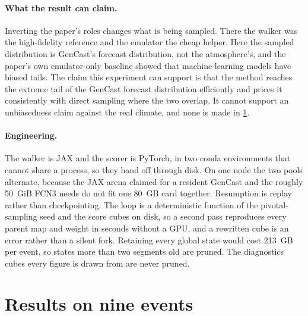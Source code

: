 \documentclass[10pt,twocolumn]{article}
\begin{document}
\paragraph{What the result can claim.}
Inverting the paper's roles changes what is being sampled. There the walker was the high-fidelity reference and the emulator the cheap helper. Here the sampled distribution is GenCast's forecast distribution, not the atmosphere's, and the paper's own emulator-only baseline showed that machine-learning models have biased tails. The claim this experiment can support is that the method reaches the extreme tail of the GenCast forecast distribution efficiently and prices it consistently with direct sampling where the two overlap. It cannot support an unbiasedness claim against the real climate, and none is made in \cref{sec:results}.

\paragraph{Engineering.}
The walker is JAX and the scorer is PyTorch, in two conda environments that cannot share a process, so they hand off through disk. On one node the two pools alternate, because the JAX arena claimed for a resident GenCast and the roughly \SI{50}{GiB} FCN3 needs do not fit one \SI{80}{GB} card together. Resumption is replay rather than checkpointing. The loop is a deterministic function of the pivotal-sampling seed and the score cubes on disk, so a second pass reproduces every parent map and weight in seconds without a GPU, and a rewritten cube is an error rather than a silent fork. Retaining every global state would cost \SI{213}{GB} per event, so states more than two segments old are pruned. The diagnostics cubes every figure is drawn from are never pruned.

\section{Results on nine events}
\label{sec:results}
\end{document}
